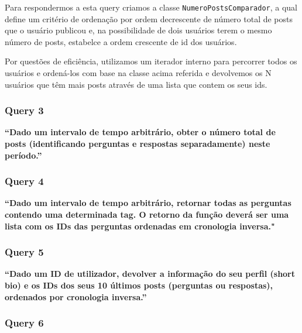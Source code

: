 \documentclass[a4paper]{article}
\begin{document}
\vspace{0.1cm}

Para respondermos a esta query criamos a classe \texttt{NumeroPostsComparador}, a
qual define um critério de ordenação por ordem decrescente de número total de posts
que o usuário publicou e, na possibilidade de dois usuários terem o mesmo número
de posts, estabelce a ordem crescente de id dos usuários.\par
Por questões de eficiência, utilizamos um iterador interno para percorrer todos os
usuários e ordená-los com base na classe acima referida e devolvemos os N
usuários que têm mais posts através de uma lista que contem os seus ids.



\subsubsection*{Query 3}
\label{sec:query3}

\textbf{“Dado um intervalo de tempo arbitrário,
obter o número total de posts (identificando perguntas e respostas separadamente) neste período.”}

\vspace{0.1cm}

\subsubsection*{Query 4}
\label{sec:query4}

\textbf{“Dado um intervalo de tempo arbitrário, retornar todas as perguntas contendo uma determinada tag.
O retorno da função deverá ser uma lista com os IDs das perguntas ordenadas em cronologia inversa."}

\vspace{0.1cm}




\subsubsection*{Query 5}
\label{sec:query5}

\textbf{“Dado um ID de utilizador,  devolver a informação do
seu perfil (short bio) e os IDs dos seus 10 últimos posts (perguntas ou respostas),
ordenados por cronologia inversa.”}

\vspace{0.1cm}


\subsubsection*{Query 6}
\label{sec:query6}
\end{document}
